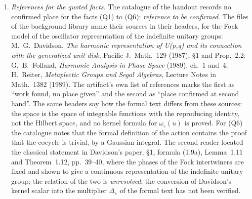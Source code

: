 \documentclass[11pt,a4paper]{article}
\newcommand{\m}[1]{\mbox{$#1$}}        %
\theoremstyle{plainx}
\theoremstyle{uprightx}
\newcommand{\weil}[2]{\omega_{#1}(#2)}                 %
\newcommand{\inn}[3]{\langle #2,#3\rangle_{#1}}        %
\begin{document}
\begin{enumerate}[label=\textup{\arabic*.},leftmargin=1.6em,itemsep=5pt]
measure-preserving map \m{z\mapsto uz+y}, that is \m{z\mapsto|v((uz+y)/c)|^2}, and both functions integrate to
\m{c^{2|I|}\inn{\varepsilon}{v}{v}}, as in \eqref{e:two}. With the dilated second function the constants match
exactly; with the undilated one the two integrals would have different scales. The second reader of the artifact,
who read the unit independently, reported the same reading of these two lines, and the structured proof now
follows it in the steps that name the two functions, the pointwise bound and the two integrals. The quotations
of the dossier were exact throughout; only its words were affected.
\item \emph{References for the quoted facts.} The catalogue of the handout records no confirmed place for the
facts (Q1) to (Q6): \emph{reference to be confirmed}. The files of the background library name their sources in
their headers, for the Fock model of the oscillator representation of the indefinite unitary groups: M.~G.~Davidson, \emph{The
harmonic representation of U(p,q) and its connection with the generalized unit disk}, Pacific J.~Math.~129
(1987), §1 and Prop.~2.2; G.~B.~Folland, \emph{Harmonic Analysis in Phase Space} (1989), ch.~1 and~4; H.~Reiter,
\emph{Metaplectic Groups and Segal Algebras}, Lecture Notes in Math.~1382 (1989). The artifact's own list of
references marks the first as ``work found, no place given'' and the second as ``place confirmed at second
hand''. The same headers say how the formal text differs from these sources: the space is the space of
integrable functions with the reproducing identity, not the Hilbert space, and no kernel formula for
\m{\weil{\varepsilon}{u}} is proved. For (Q6) the catalogue notes that the formal definition of the action
contains the proof that the cocycle is trivial, by a Gaussian integral. The second reader located the classical
statement in Davidson's paper, §1, formula (1.9a), Lemma~1.11 and Theorem~1.12, pp.~39--40, where the phases of
the Fock intertwiners are fixed and shown to give a continuous representation of the indefinite unitary group; the
relation of the two is \emph{unresolved}: the conversion of Davidson's kernel scalar into the multiplier
\m{\Delta_{\varepsilon}} of the formal text has not been verified.
\end{enumerate}
\end{document}
